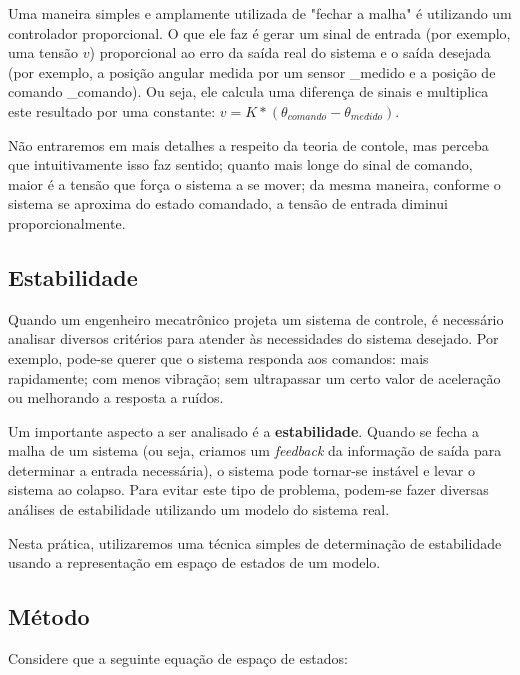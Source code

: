 \documentclass[12pt,a4paper,english,brazil]{article}
\begin{document}
Uma maneira simples e amplamente utilizada de "fechar a malha" é utilizando um controlador proporcional. O que ele faz é gerar um sinal de entrada (por exemplo, uma tensão $v$) proporcional ao erro da saída real do sistema e o saída desejada (por exemplo, a posição angular medida por um sensor \theta_{medido} e a posição de comando \theta_{comando}). Ou seja, ele calcula uma diferença de sinais e multiplica este resultado por uma constante: $v = K * (\theta_{comando} - \theta_{medido})$. \

Não entraremos em mais detalhes a respeito da teoria de contole, mas perceba que intuitivamente isso faz sentido; quanto mais longe do sinal de comando, maior é a tensão que força o sistema a se mover; da mesma maneira, conforme o sistema se aproxima do estado comandado, a tensão de entrada diminui proporcionalmente. \


\subsection{Estabilidade}\label{sec-estabilidade}

Quando um engenheiro mecatrônico projeta um sistema de controle, é necessário analisar diversos critérios para atender às necessidades do sistema desejado. Por exemplo, pode-se querer que o sistema responda aos comandos:  mais rapidamente; com menos vibração; sem ultrapassar um certo valor de aceleração ou melhorando a resposta a ruídos. \

Um importante aspecto a ser analisado é a \textbf{estabilidade}. Quando se fecha a malha de um sistema (ou seja, criamos um \textit{feedback} da informação de saída para determinar a entrada necessária), o sistema pode tornar-se instável e levar o sistema ao colapso. Para evitar este tipo de problema, podem-se fazer diversas análises de estabilidade utilizando um modelo do sistema real. \

Nesta prática, utilizaremos uma técnica simples de determinação de estabilidade usando a representação em espaço de estados de um modelo. \

\subsection{Método}\label{sec-metodo}

Considere que a seguinte equação de espaço de estados:
\end{document}
